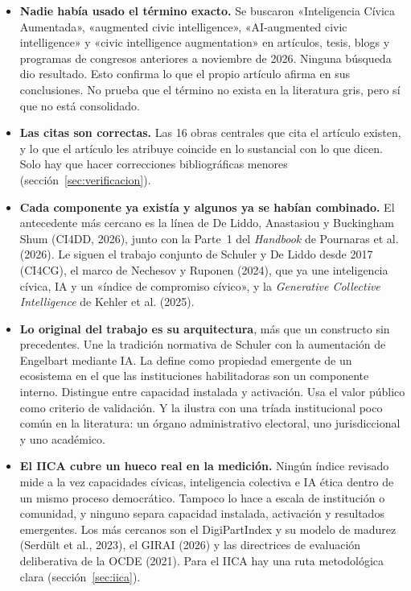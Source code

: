 \documentclass[11pt,a4paper]{article}
\begin{document}
\begin{itemize}
  \item \textbf{Nadie había usado el término exacto.} Se buscaron «Inteligencia Cívica Aumentada», «augmented civic intelligence», «AI-augmented civic intelligence» y «civic intelligence augmentation» en artículos, tesis, blogs y programas de congresos anteriores a noviembre de 2026. Ninguna búsqueda dio resultado. Esto confirma lo que el propio artículo afirma en sus conclusiones. No prueba que el término no exista en la literatura gris, pero sí que no está consolidado.
  \item \textbf{Las citas son correctas.} Las 16 obras centrales que cita el artículo existen, y lo que el artículo les atribuye coincide en lo sustancial con lo que dicen. Solo hay que hacer correcciones bibliográficas menores (sección~\ref{sec:verificacion}).
  \item \textbf{Cada componente ya existía y algunos ya se habían combinado.} El antecedente más cercano es la línea de De Liddo, Anastasiou y Buckingham Shum (CI4DD, 2026), junto con la Parte~1 del \emph{Handbook} de Pournaras et al. (2026). Le siguen el trabajo conjunto de Schuler y De Liddo desde 2017 (CI4CG), el marco de Nechesov y Ruponen (2024), que ya une inteligencia cívica, IA y un «índice de compromiso cívico», y la \emph{Generative Collective Intelligence} de Kehler et al. (2025).
  \item \textbf{Lo original del trabajo es su arquitectura}, más que un constructo sin precedentes. Une la tradición normativa de Schuler con la aumentación de Engelbart mediante IA. La define como propiedad emergente de un ecosistema en el que las instituciones habilitadoras son un componente interno. Distingue entre capacidad instalada y activación. Usa el valor público como criterio de validación. Y la ilustra con una tríada institucional poco común en la literatura: un órgano administrativo electoral, uno jurisdiccional y uno académico.
  \item \textbf{El IICA cubre un hueco real en la medición.} Ningún índice revisado mide a la vez capacidades cívicas, inteligencia colectiva e IA ética dentro de un mismo proceso democrático. Tampoco lo hace a escala de institución o comunidad, y ninguno separa capacidad instalada, activación y resultados emergentes. Los más cercanos son el DigiPartIndex y su modelo de madurez (Serdült et al., 2023), el GIRAI (2026) y las directrices de evaluación deliberativa de la OCDE (2021). Para el IICA hay una ruta metodológica clara (sección~\ref{sec:iica}).
\end{itemize}
\end{document}
